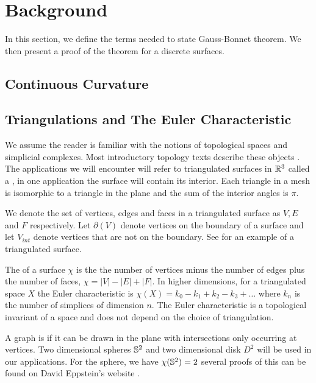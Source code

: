 \section{Background}\label{sec:background}
\label{sec:cast}

In this section, we define the terms needed to state Gauss-Bonnet theorem.
We then present a proof of the theorem for a discrete surfaces.


\subsection{Continuous Curvature}


\subsection{Triangulations and The Euler Characteristic}

We assume the reader is familiar with the notions
of topological spaces and simplicial complexes.
Most introductory topology texts describe these objects \cite{jm08,munkres}.
The applications we will encounter will refer to triangulated surfaces in $\mathbb{R}^3$
called a , in one application the surface will contain its interior.
Each triangle in a mesh is isomorphic to a triangle in the plane and the sum
of the interior angles is $\pi$.


We denote the set of vertices, edges and faces in a triangulated surface as 
$V, E$ and $F$ respectively.
Let $\partial(V)$ denote vertices on the boundary of a surface and let $V_{int}$ 
denote vertices that are not on the boundary.
See  for an example of a triangulated surface.



The  of a surface $\chi$ is the 
the number of vertices minus the number of edges plus  the number of faces, $\chi=|V|-|E|+|F|.$
In higher dimensions, for a triangulated space $X$ the Euler characteristic is 
$\chi(X)=k_0-k_1+k_2-k_3+\ldots$ where $k_n$ is the number of simplices of dimension $n.$
The Euler characteristic is a topological invariant of a space
and does not depend on the choice of triangulation.

A  graph  is  if it can be drawn in the plane with intersections only occurring
at vertices.
Two dimensional spheres $\mathbb{S}^2$ and two dimensional disk $D^2$ 
will be used in our applications.
For the sphere, we have $\chi(\mathbb{S}^2)=2$ 
several proofs of this can be found on David Eppstein's website \cite{eppstein-proofs}.




